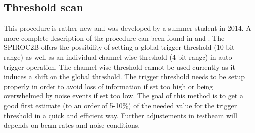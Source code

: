 \subsection{Threshold scan}

This procedure is rather new and was developed by a summer student in 2014. A more complete description of the procedure can been found in \cite{Hartbrich:2016bbz} and \cite{LloydTrigger}. The SPIROC2B offers the possibility of setting a global trigger threshold (10-bit range) as well as an individual channel-wise threshold (4-bit range) in auto-trigger operation. The channel-wise threshold cannot be used currently as it induces a shift on the global threshold. The trigger threshold needs to be setup properly in order to avoid loss of information if set too high or being overwhelmed by noise events if set too low. The goal of this method is to get a good first estimate (to an order of 5-10\%) of the needed value for the trigger threshold in a quick and efficient way. Further adjustements in testbeam will depends on beam rates and noise conditions.

